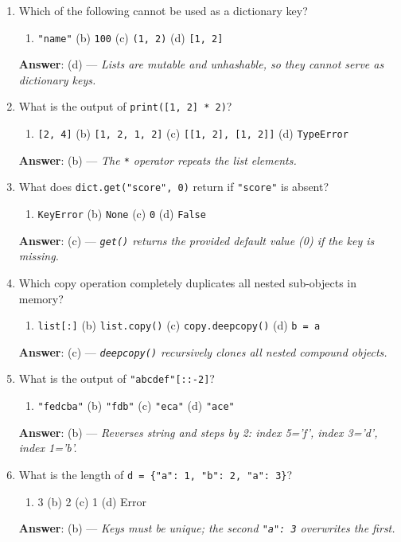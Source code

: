\begin{enumerate}[leftmargin=1.5em]
    \item Which of the following cannot be used as a dictionary key?
    \begin{enumerate}[label=(\alph*)]
        \item \texttt{"name"} \quad (b) \texttt{100} \quad (c) \texttt{(1, 2)} \quad (d) \texttt{[1, 2]}
    \end{enumerate}
    \textbf{Answer}: (d) --- \textit{Lists are mutable and unhashable, so they cannot serve as dictionary keys.}

    \item What is the output of \texttt{print([1, 2] * 2)}?
    \begin{enumerate}[label=(\alph*)]
        \item \texttt{[2, 4]} \quad (b) \texttt{[1, 2, 1, 2]} \quad (c) \texttt{[[1, 2], [1, 2]]} \quad (d) \texttt{TypeError}
    \end{enumerate}
    \textbf{Answer}: (b) --- \textit{The \texttt{*} operator repeats the list elements.}

    \item What does \texttt{dict.get("score", 0)} return if \texttt{"score"} is absent?
    \begin{enumerate}[label=(\alph*)]
        \item \texttt{KeyError} \quad (b) \texttt{None} \quad (c) \texttt{0} \quad (d) \texttt{False}
    \end{enumerate}
    \textbf{Answer}: (c) --- \textit{\texttt{get()} returns the provided default value (0) if the key is missing.}

    \item Which copy operation completely duplicates all nested sub-objects in memory?
    \begin{enumerate}[label=(\alph*)]
        \item \texttt{list[:]} \quad (b) \texttt{list.copy()} \quad (c) \texttt{copy.deepcopy()} \quad (d) \texttt{b = a}
    \end{enumerate}
    \textbf{Answer}: (c) --- \textit{\texttt{deepcopy()} recursively clones all nested compound objects.}

    \item What is the output of \texttt{"abcdef"[::-2]}?
    \begin{enumerate}[label=(\alph*)]
        \item \texttt{"fedcba"} \quad (b) \texttt{"fdb"} \quad (c) \texttt{"eca"} \quad (d) \texttt{"ace"}
    \end{enumerate}
    \textbf{Answer}: (b) --- \textit{Reverses string and steps by 2: index 5='f', index 3='d', index 1='b'.}

    \item What is the length of \texttt{d = \{"a": 1, "b": 2, "a": 3\}}?
    \begin{enumerate}[label=(\alph*)]
        \item 3 \quad (b) 2 \quad (c) 1 \quad (d) Error
    \end{enumerate}
    \textbf{Answer}: (b) --- \textit{Keys must be unique; the second \texttt{"a": 3} overwrites the first.}
\end{enumerate}

